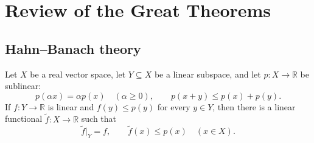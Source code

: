 \chapter{Review of the Great Theorems}

\section{Hahn--Banach theory}

\begin{notetheorem}
Let $X$ be a real vector space, let $Y\subseteq X$ be a linear subspace, and
let $p\colon X\to\mathbb R$ be sublinear:
\[
  p(\alpha x)=\alpha p(x)\quad(\alpha\ge0),
  \qquad
  p(x+y)\le p(x)+p(y).
\]
If $f\colon Y\to\mathbb R$ is linear and $f(y)\le p(y)$ for every $y\in Y$,
then there is a linear functional $\widetilde f\colon X\to\mathbb R$ such that
\[
  \widetilde f|_Y=f,
  \qquad
  \widetilde f(x)\le p(x)\quad(x\in X).
\]
\end{notetheorem}

